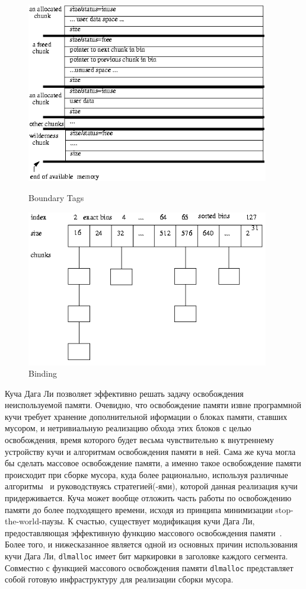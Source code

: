 \begin{figure}[h!]
	\centering
	\includegraphics[width=300pt]{Berezun/images/boundaryTags.png}
	\caption{Boundary Tags}
	\centering
	\includegraphics[width=300pt]{Berezun/images/binding.png}
	\caption{Binding}
\end{figure}

Куча Дага Ли позволяет эффективно решать задачу освобождения неиспользуемой памяти.
Очевидно, что освобождение памяти извне программной кучи требует хранение дополнительной иформации о блоках памяти,
ставших мусором, и нетривиальную реализацию обхода этих блоков с целью освобождения, время которого будет весьма
чувствительно к внутреннему устройству кучи и алгоритмам освобождения памяти в ней.
Сама же куча могла бы сделать массовое освобождение памяти, а именно такое освобождение памяти происходит при сборке мусора,
куда более рационально, используя различные алгоритмы~\cite{GCBook1}
и руководствуясь стратегией(-ями), которой данная реализация кучи придерживается.
Куча может вообще отложить часть работы по освобождению памяти до более подходящего времени,
исходя из принципа минимизации stop-the-world-паузы.
К счастью, существует модификация кучи Дага Ли,
предоставляющая эффективную функцию массового освобождения памяти~\cite{msmalloc}.
Более того, и нижесказанное является одной из основных причин использования кучи Дага Ли,
\lstinline[language= cpp]{dlmalloc} имеет бит маркировки в заголовке каждого сегмента. Совместно с функцией массового освобождения
памяти \lstinline[language= cpp]{dlmalloc} представляет собой готовую инфраструктуру для реализации сборки мусора.

